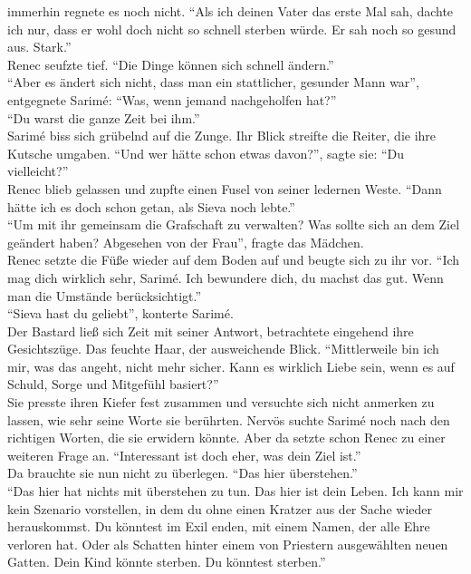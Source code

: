 immerhin regnete es noch nicht. ``Als ich deinen Vater das erste Mal sah, dachte ich nur, dass er 
wohl doch nicht so schnell sterben würde. Er sah noch so gesund aus. Stark.''\\
Renec seufzte tief. ``Die Dinge können sich schnell ändern.''\\
``Aber es ändert sich nicht, dass man ein stattlicher, gesunder Mann war'', entgegnete Sarimé: 
``Was, wenn jemand nachgeholfen hat?''\\
``Du warst die ganze Zeit bei ihm.''\\
Sarimé biss sich grübelnd auf die Zunge. Ihr Blick streifte die Reiter, die ihre Kutsche umgaben. 
``Und wer hätte schon etwas davon?'', sagte sie: ``Du vielleicht?''\\
Renec blieb gelassen und zupfte einen Fusel von seiner ledernen Weste. ``Dann hätte ich es doch 
schon getan, als Sieva noch lebte.''\\
``Um mit ihr gemeinsam die Grafschaft zu verwalten? Was sollte sich an dem Ziel geändert haben? 
Abgesehen von der Frau'', fragte das Mädchen.\\
Renec setzte die Füße wieder auf dem Boden auf und beugte sich zu ihr vor. ``Ich mag dich wirklich 
sehr, Sarimé. Ich bewundere dich, du machst das gut. Wenn man die Umstände berücksichtigt.''\\
``Sieva hast du geliebt'', konterte Sarimé.\\
Der Bastard ließ sich Zeit mit seiner Antwort, betrachtete eingehend ihre Gesichtszüge. Das feuchte 
Haar, der ausweichende Blick. ``Mittlerweile bin ich mir, was das angeht, nicht mehr sicher. Kann 
es wirklich Liebe sein, wenn es auf Schuld, Sorge und Mitgefühl basiert?''\\
Sie presste ihren Kiefer fest zusammen und versuchte sich nicht anmerken zu lassen, wie sehr seine 
Worte sie berührten. Nervös suchte Sarimé noch nach den richtigen Worten, die sie erwidern könnte. 
Aber da setzte schon Renec zu einer weiteren Frage an. ``Interessant ist doch eher, was dein Ziel 
ist.''\\
Da brauchte sie nun nicht zu überlegen. ``Das hier überstehen.''\\
``Das hier hat nichts mit überstehen zu tun. Das hier ist dein Leben. Ich kann mir kein Szenario 
vorstellen, in dem du ohne einen Kratzer aus der Sache wieder herauskommst. Du könntest im Exil 
enden, mit einem Namen, der alle Ehre verloren hat. Oder als Schatten hinter einem von Priestern 
ausgewählten neuen Gatten. Dein Kind könnte sterben. Du könntest sterben.''\\
